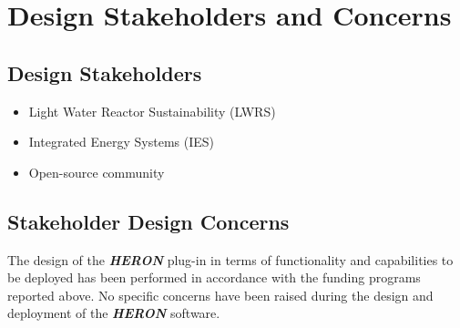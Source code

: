 \section{Design Stakeholders and Concerns}
\subsection{Design Stakeholders}
\begin{itemize}
  \item Light Water Reactor Sustainability (LWRS)
  \item Integrated Energy Systems (IES) 
  \item Open-source community 
\end{itemize}
\subsection{Stakeholder Design Concerns}
The design of the \textbf{\textit{HERON}} plug-in in terms of functionality and capabilities to be deployed has been performed in 
accordance with the funding programs reported above. No specific concerns have been raised during the design and 
deployment of the \textbf{\textit{HERON}} software. 